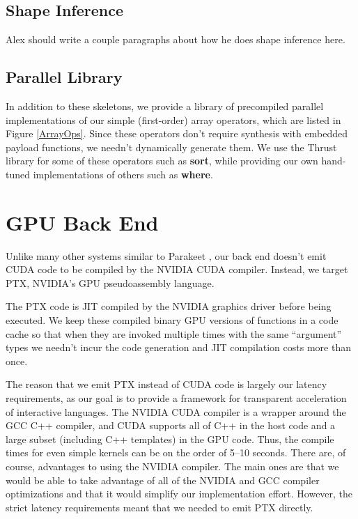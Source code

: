 \documentclass[preprint]{sigplanconf}
\begin{document}
\subsection{Shape Inference}
\label{shapeinference}

Alex should write a couple paragraphs about how he does shape inference here.

\subsection{Parallel Library}

In addition to these skeletons, we provide a library of precompiled parallel implementations of our simple (first-order) array operators, which are listed in Figure \ref{ArrayOps}.  Since these operators don't require synthesis with embedded payload functions, we needn't dynamically generate them.  We use the Thrust library \cite{Hobe10} for some of these operators such as \textbf{sort}, while providing our own hand-tuned implementations of others such as \textbf{where}.

\section{GPU Back End}
Unlike many other systems similar to Parakeet \cite{Cata10,Chaf11}, our back end doesn't emit CUDA code to be compiled by the NVIDIA CUDA compiler.  Instead, we target PTX, NVIDIA's GPU pseudoassembly language. 

The PTX code is JIT compiled by the NVIDIA graphics driver before being executed.  We keep these compiled binary GPU versions of functions in a code cache so that when they are invoked multiple times with the same ``argument'' types we needn't incur the code generation and JIT compilation costs more than once.

The reason that we emit PTX instead of CUDA code is largely our latency requirements, as our goal is to provide a framework for transparent acceleration of interactive languages. The NVIDIA CUDA compiler is a wrapper around the GCC C++ compiler, and CUDA supports all of C++ in the host code and a large subset (including C++ templates) in the GPU code.  Thus, the compile times for even simple kernels can be on the order of 5--10 seconds.  There are, of course, advantages to using the NVIDIA compiler. The main ones are that we would be able to take advantage of all of the NVIDIA and GCC compiler optimizations and that it would simplify our implementation effort.  However, the strict latency requirements meant that we needed to emit PTX directly.
\end{document}
